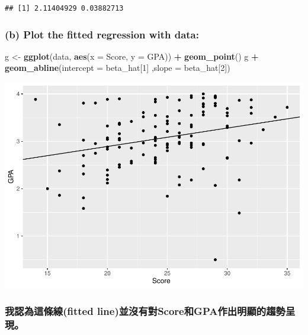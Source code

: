 \documentclass[]{article}
\newenvironment{Shaded}{\begin{snugshade}}{\end{snugshade}}
\newcommand{\KeywordTok}[1]{\textcolor[rgb]{0.13,0.29,0.53}{\textbf{#1}}}
\newcommand{\DataTypeTok}[1]{\textcolor[rgb]{0.13,0.29,0.53}{#1}}
\newcommand{\DecValTok}[1]{\textcolor[rgb]{0.00,0.00,0.81}{#1}}
\newcommand{\StringTok}[1]{\textcolor[rgb]{0.31,0.60,0.02}{#1}}
\newcommand{\OperatorTok}[1]{\textcolor[rgb]{0.81,0.36,0.00}{\textbf{#1}}}
\newcommand{\NormalTok}[1]{#1}
\begin{document}
\begin{verbatim}
## [1] 2.11404929 0.03882713
\end{verbatim}

\subsubsection{(b) Plot the fitted regression with
data:}\label{b-plot-the-fitted-regression-with-data}

\begin{Shaded}
\begin{Highlighting}[]
\NormalTok{g <-}\StringTok{ }\KeywordTok{ggplot}\NormalTok{(data, }\KeywordTok{aes}\NormalTok{(}\DataTypeTok{x =}\NormalTok{ Score, }\DataTypeTok{y =}\NormalTok{ GPA)) }\OperatorTok{+}\StringTok{ }\KeywordTok{geom_point}\NormalTok{() }
\NormalTok{g }\OperatorTok{+}\StringTok{ }\KeywordTok{geom_abline}\NormalTok{(}\DataTypeTok{intercept =}\NormalTok{ beta_hat[}\DecValTok{1}\NormalTok{] ,}\DataTypeTok{slope =}\NormalTok{ beta_hat[}\DecValTok{2}\NormalTok{])}
\end{Highlighting}
\end{Shaded}

\includegraphics{APLM-hw01_files/figure-latex/(b)Plot-1.pdf}

\subsubsection{我認為這條線(fitted
line)並沒有對Score和GPA作出明顯的趨勢呈現。}\label{ux6211ux8a8dux70baux9019ux689dux7ddafitted-lineux4e26ux6c92ux6709ux5c0dscoreux548cgpaux4f5cux51faux660eux986fux7684ux8da8ux52e2ux5448ux73fe}
\end{document}
